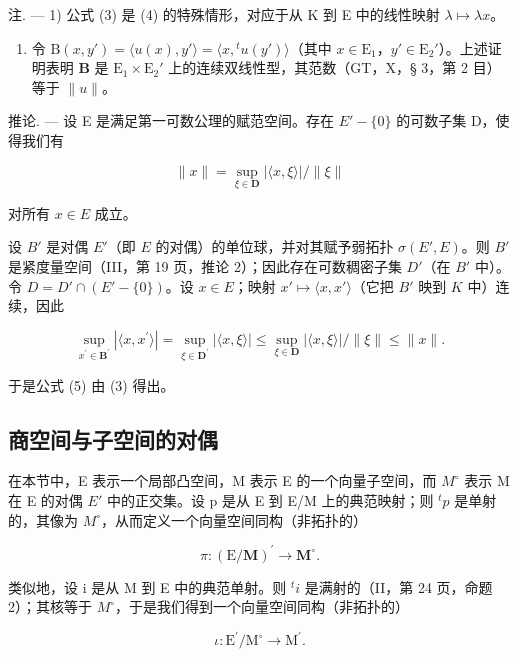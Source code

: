 注. --- 1) 公式 (3) 是 (4) 的特殊情形，对应于从 K 到 E 中的线性映射 \(\lambda \mapsto \lambda x\)。

\begin{enumerate}
\def\labelenumi{\arabic{enumi})}
\setcounter{enumi}{1}
\tightlist
\item
  令 \(\mathrm{B}(x, y') = \langle u(x), y' \rangle = \langle x, {}^t u(y') \rangle\)（其中 \(x \in \mathrm{E}_1\)，\(y' \in \mathrm{E}_2'\)）。上述证明表明 \(\mathbf{B}\) 是 \(\mathrm{E}_1 \times \mathrm{E}_2'\) 上的连续双线性型，其范数（GT，X，§ 3，第 2 目）等于 \(\| u \|\)。
\end{enumerate}

推论. --- 设 E 是满足第一可数公理的赋范空间。存在 \(E' - \{0\}\) 的可数子集 D，使得我们有

\[
\| x \| = \sup _ {\xi \in \mathbf {D}} | \langle x, \xi \rangle | / \| \xi \|\tag{5}
\]

对所有 \(x \in E\) 成立。

设 \(B'\) 是对偶 \(E'\)（即 \(E\) 的对偶）的单位球，并对其赋予弱拓扑 \(\sigma(E', E)\)。则 \(B'\) 是紧度量空间（III，第 19 页，推论 2）；因此存在可数稠密子集 \(D'\)（在 \(B'\) 中）。令 \(D = D' \cap (E' - \{0\})\)。设 \(x \in E\)；映射 \(x' \mapsto \langle x, x' \rangle\)（它把 \(B'\) 映到 \(K\) 中）连续，因此

\[
\sup _ {x ^ {\prime} \in \mathbf {B} ^ {\prime}} | \langle x, x ^ {\prime} \rangle | = \sup _ {\xi \in \mathbf {D} ^ {\prime}} | \langle x, \xi \rangle | \leqslant \sup _ {\xi \in \mathbf {D}} | \langle x, \xi \rangle | / \| \xi \| \leqslant \| x \|.
\]

于是公式 (5) 由 (3) 得出。

\subsection{商空间与子空间的对偶}

在本节中，E 表示一个局部凸空间，M 表示 E 的一个向量子空间，而 \(M^{\circ}\) 表示 M 在 E 的对偶 \(E'\) 中的正交集。设 p 是从 E 到 E/M 上的典范映射；则 \(^{t}p\) 是单射的，其像为 \(M^{\circ}\)，从而定义一个向量空间同构（非拓扑的）

\[
\pi : (\mathrm{E} / \mathbf {M}) ^ {\prime} \rightarrow \mathbf {M} ^ {\circ}.
\]

类似地，设 i 是从 M 到 E 中的典范单射。则 \({}^{t}i\) 是满射的（II，第 24 页，命题 2）；其核等于 \(M^{\circ}\)，于是我们得到一个向量空间同构（非拓扑的）

\[
\iota : \mathrm{E} ^ {\prime} / \mathrm{M} ^ {\circ} \rightarrow \mathrm{M} ^ {\prime}.
\]

